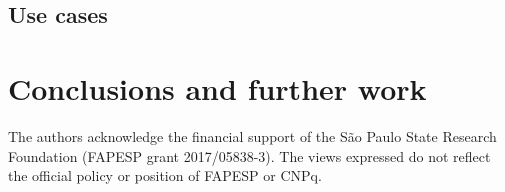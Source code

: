 \documentclass[Afour,sagev,times]{sagej}
\begin{document}
\subsection{Use cases}

\section{Conclusions and further work}
\begin{acks}
The authors acknowledge the financial support of the S\~ao Paulo State Research Foundation (FAPESP grant 2017/05838-3).
The views expressed do not reflect the official policy or position of FAPESP or CNPq.
\end{acks}



% 
% 

\end{document}
